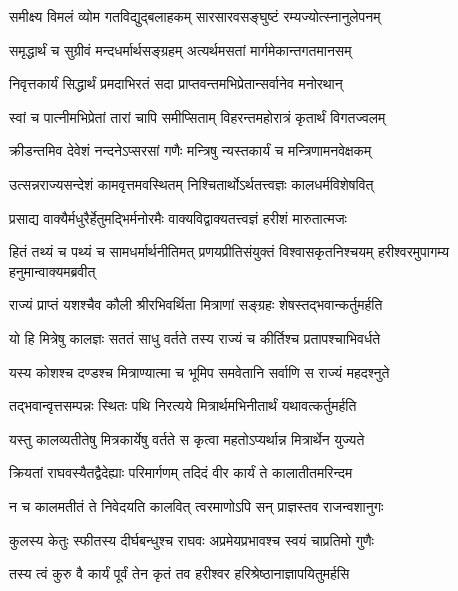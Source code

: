 \twolineshloka
{समीक्ष्य विमलं व्योम गतविद्युद्बलाहकम्}
{सारसारवसङ्घुष्टं रम्यज्योत्स्नानुलेपनम्} %

\twolineshloka
{समृद्धार्थं च सुग्रीवं मन्दधर्मार्थसङ्ग्रहम्}
{अत्यर्थमसतां मार्गमेकान्तगतमानसम्} %

\twolineshloka
{निवृत्तकार्यं सिद्धार्थं प्रमदाभिरतं सदा}
{प्राप्तवन्तमभिप्रेतान्सर्वानेव मनोरथान्} %

\twolineshloka
{स्वां च पात्नीमभिप्रेतां तारां चापि समीप्सिताम्}
{विहरन्तमहोरात्रं कृतार्थं विगतज्वलम्} %

\twolineshloka
{क्रीडन्तमिव देवेशं नन्दनेऽप्सरसां गणैः}
{मन्त्रिषु न्यस्तकार्यं च मन्त्रिणामनवेक्षकम्} %

\twolineshloka
{उत्सन्नराज्यसन्देशं कामवृत्तमवस्थितम्}
{निश्चितार्थोऽर्थतत्त्वज्ञः कालधर्मविशेषवित्} %

\twolineshloka
{प्रसाद्य वाक्यैर्मधुरैर्हेतुमद्भिर्मनोरमैः}
{वाक्यविद्वाक्यतत्त्वज्ञं हरीशं मारुतात्मजः} %

\threelineshloka
{हितं तथ्यं च पथ्यं च सामधर्मार्थनीतिमत्}
{प्रणयप्रीतिसंयुक्तं विश्वासकृतनिश्चयम्}
{हरीश्वरमुपागम्य हनुमान्वाक्यमब्रवीत्} %

\twolineshloka
{राज्यं प्राप्तं यशश्चैव कौली श्रीरभिवर्थिता}
{मित्राणां सङ्ग्रहः शेषस्तद्भवान्कर्तुमर्हति} %

\twolineshloka
{यो हि मित्रेषु कालज्ञः सततं साधु वर्तते}
{तस्य राज्यं च कीर्तिश्च प्रतापश्चाभिवर्धते} %

\twolineshloka
{यस्य कोशश्च दण्डश्च मित्राण्यात्मा च भूमिप}
{समवेतानि सर्वाणि स राज्यं महदश्नुते} %

\twolineshloka
{तद्भवान्वृत्तसम्पन्नः स्थितः पथि निरत्यये}
{मित्रार्थमभिनीतार्थं यथावत्कर्तुमर्हति} %

\twolineshloka
{यस्तु कालव्यतीतेषु मित्रकार्येषु वर्तते}
{स कृत्वा महतोऽप्यर्थान्न मित्रार्थेन युज्यते} %

\twolineshloka
{क्रियतां राघवस्यैतद्वैदेह्याः परिमार्गणम्}
{तदिदं वीर कार्यं ते कालातीतमरिन्दम} %

\twolineshloka
{न च कालमतीतं ते निवेदयति कालवित्}
{त्वरमाणोऽपि सन् प्राज्ञस्तव राजन्वशानुगः} %

\twolineshloka
{कुलस्य केतुः स्फीतस्य दीर्घबन्धुश्च राघवः}
{अप्रमेयप्रभावश्च स्वयं चाप्रतिमो गुणैः} %

\twolineshloka
{तस्य त्वं कुरु वै कार्यं पूर्वं तेन कृतं तव}
{हरीश्वर हरिश्रेष्ठानाज्ञापयितुमर्हसि} %

